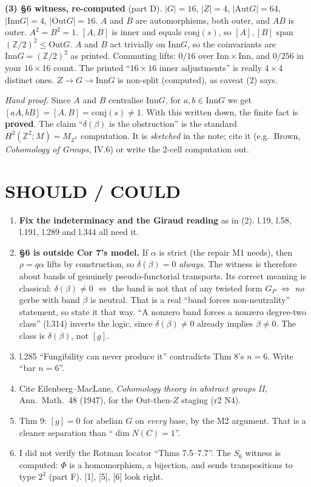 \documentclass[11pt]{article}
\newcommand{\Z}{\mathbb{Z}}
\newcommand{\Inn}{\mathrm{Inn}}
\newcommand{\Out}{\mathrm{Out}}
\newcommand{\Aut}{\mathrm{Aut}}
\newcommand{\conj}{\mathrm{conj}}
\newcommand{\vd}[1]{\fbox{\textbf{#1}}}
\begin{document}
\textbf{(3) §6 witness, re-computed} (part D). $|G|=16$, $|Z|=4$, $|\Aut G|=64$, $|\Inn G|=4$,
$|\Out G|=16$. $A$ and $B$ are automorphisms, both outer, and $AB$ is outer. $A^2=B^2=1$. $[A,B]$ is
inner and equals $\conj(s)$, so $[A],[B]$ span $(\Z/2)^2\le\Out G$. $A$ and $B$ act trivially on
$\Inn G$, so the coinvariants are $\Inn G=(\Z/2)^2$ as printed. Commuting lifts: $0/16$ over
$\Inn\times\Inn$, and $0/256$ in your $16\times16$ count. The printed ``$16\times16$ inner
adjustments'' is really $4\times4$ distinct ones. $Z\to G\to\Inn G$ is non-split (computed), as
caveat (2) says.

\emph{Hand proof.} Since $A$ and $B$ centralise $\Inn G$, for $a,b\in\Inn G$ we get
$[aA,bB]=[A,B]=\conj(s)\neq1$. With this written down, the finite fact is \textbf{proved}. The
claim ``$\delta(\beta)$ is the obstruction'' is the standard $H^2(\Z^2;M)=M_{\Z^2}$ computation. It
is \emph{sketched} in the note; cite it (e.g.\ Brown, \emph{Cohomology of Groups}, IV.6) or write
the 2-cell computation out.

\section{SHOULD / COULD}
\begin{enumerate}[label=\textbf{S\arabic*},leftmargin=*]
\item \vd{SHOULD} \textbf{Fix the indeterminacy and the Giraud reading} as in (2). l.19, l.58,
l.191, l.289 and l.344 all need it.
\item \vd{SHOULD} \textbf{§6 is outside Cor 7's model.} If $\alpha$ is strict (the repair M1 needs),
then $\rho=q\alpha$ lifts by construction, so $\delta(\beta)=0$ \emph{always}. The witness is
therefore about bands of genuinely pseudo-functorial transports. Its correct meaning is classical:
$\delta(\beta)\neq0$ $\iff$ the band is not that of any twisted form $G_P$ $\iff$ \emph{no} gerbe
with band $\beta$ is neutral. That is a real ``band forces non-neutrality'' statement, so state it
that way. ``A nonzero band forces a nonzero degree-two class'' (l.314) inverts the logic, since
$\delta(\beta)\neq0$ already implies $\beta\neq0$. The class is $\delta(\beta)$, not $[g]$.
\item \vd{SHOULD} l.285 ``Fungibility can never produce it'' contradicts Thm 8's $n=6$. Write
``bar $n=6$''.
\item \vd{SHOULD} Cite Eilenberg--MacLane, \emph{Cohomology theory in abstract groups II}, Ann.\
Math.\ 48 (1947), for the $\Out$-then-$Z$ staging (r2 N4).
\item \vd{COULD} Thm 9: $[g]=0$ for abelian $G$ on \emph{every} base, by the M2 argument. That is a
cleaner separation than ``$\dim N(C)=1$''.
\item \vd{COULD} I did not verify the Rotman locator ``Thms 7.5--7.7''. The $S_6$ witness is
computed: $\Phi$ is a homomorphism, a bijection, and sends transpositions to type $2^3$ (part F).
[1], [5], [6] look right.
\end{enumerate}
\end{document}
